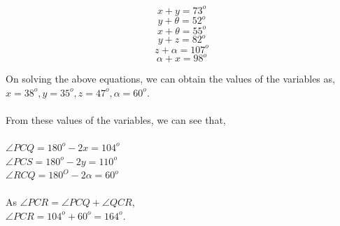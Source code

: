 \documentclass[8pt, twocolumn]{article}
\begin{document}
\begin{equation}
    x + y = 73^o
\end{equation}
\begin{equation}
    y + \theta = 52^o
\end{equation}
\begin{equation}
    x + \theta = 55^o
\end{equation}
\begin{equation}
    y + z = 82^o
\end{equation}
\begin{equation}
    z + \alpha = 107^o
\end{equation}
\begin{equation}
    \alpha + x = 98^o
\end{equation}

On solving the above equations, we can obtain the values of the variables as, $x = 38^o, y = 35^o, z = 47^o, \alpha = 60^o .$\\\\
From these values of the variables, we can see that,\\\\
$\angle PCQ = 180^o - 2x = 104^o$\\
$\angle PCS = 180^o - 2y = 110^o$\\
$\angle RCQ = 180^O - 2\alpha = 60^o$\\\\
As $\angle PCR = \angle PCQ +\angle QCR$,\\ $\angle PCR = 104^o + 60^o = 164^o$.\\
\end{document}
